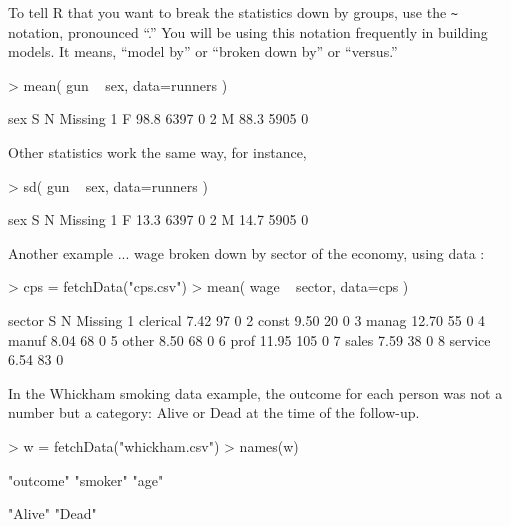 To tell R that you want to break the statistics down by groups, use
the \verb+~+ notation, pronounced ``.''  You will be
using this notation frequently in building models.  It means, ``model
by'' or ``broken down by'' or ``versus.''
\begin{Schunk}
\begin{Sinput}
> mean( gun ~ sex, data=runners )
\end{Sinput}
\begin{Soutput}
  sex    S    N Missing
1   F 98.8 6397       0
2   M 88.3 5905       0
\end{Soutput}
\end{Schunk}

Other statistics work the same way, for instance,
\begin{Schunk}
\begin{Sinput}
> sd( gun ~ sex, data=runners )
\end{Sinput}
\begin{Soutput}
  sex    S    N Missing
1   F 13.3 6397       0
2   M 14.7 5905       0
\end{Soutput}
\end{Schunk}

Another example ... wage broken down by sector of the economy, using
data :
\begin{Schunk}
\begin{Sinput}
> cps = fetchData("cps.csv")
> mean( wage ~ sector, data=cps )
\end{Sinput}
\begin{Soutput}
    sector     S   N Missing
1 clerical  7.42  97       0
2    const  9.50  20       0
3    manag 12.70  55       0
4    manuf  8.04  68       0
5    other  8.50  68       0
6     prof 11.95 105       0
7    sales  7.59  38       0
8  service  6.54  83       0
\end{Soutput}
\end{Schunk}

In the Whickham smoking data example, the outcome for each person was
not a number but a category: Alive or Dead at the time of the
follow-up.  \datasetWhickham
\begin{Schunk}
\begin{Sinput}
> w = fetchData("whickham.csv")
> names(w)
\end{Sinput}
\begin{Soutput}
[1] "outcome" "smoker"  "age"    
\end{Soutput}
\begin{Soutput}
[1] "Alive" "Dead" 
\end{Soutput}
\end{Schunk}

